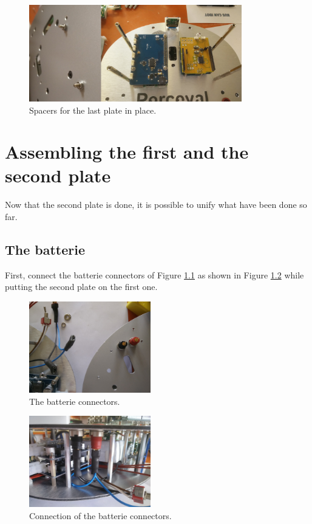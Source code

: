 \documentclass[10pt,a4paper]{report}   %
\begin{document}
\begin{figure}[H]
\center
\includegraphics[width=350px]{images/65_3.jpg}
\caption{Spacers for the last plate in place.}
\label{fig:65_3}
\end{figure}


\chapter{Assembling the first and the second plate}

Now that the second plate is done, it is possible to unify what have been done so far.

\section{The batterie}
First, connect the batterie connectors of Figure \ref{fig:65} as shown in Figure \ref{fig:66} while putting the second plate on the first one. 

\begin{figure}[H]
\center
\includegraphics[width=200px]{images/65.jpg}
\caption{The batterie connectors.}
\label{fig:65}
\end{figure}

\begin{figure}[H]
\center
\includegraphics[width=200px]{images/66.jpg}
\caption{Connection of the batterie connectors.}
\label{fig:66}
\end{figure}
\end{document}

